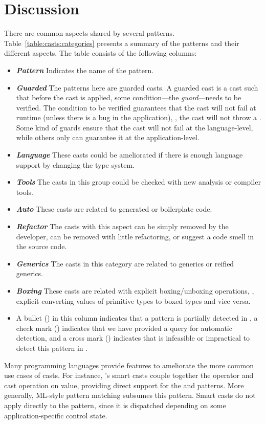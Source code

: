 \section{Discussion}\label{sec:casts:discussion}

\newcommand{\gc}[1]{\emph{\textbf{#1}}}
\newcommand{\gh}[1]{\item\gc{#1}}
There are common aspects shared by several patterns.
Table~\ref{table:casts:categories} presents a summary of the patterns and their different aspects.
The table consists of the following columns:
\begin{itemize}
\gh{Pattern} Indicates the name of the pattern.
\gh{Guarded} The patterns here are guarded casts.
A guarded cast is a cast such that before the cast is applied,
some condition---the \emph{guard}---needs to be verified.
The condition to be verified guarantees that the cast will not fail at runtime (unless there is a bug in the application), \ie,
the cast will not throw a .
Some kind of guards ensure that the cast will not fail at the language-level,
while others only can guarantee it at the application-level.
\gh{Language} These casts could be ameliorated if there is enough language support by changing the type system.
\gh{Tools} The casts in this group could be checked with new analysis or compiler tools.
\gh{Auto} These casts are related to generated or boilerplate code.
\gh{Refactor} The casts with this aspect can be simply removed by the developer,
can be removed with little refactoring,
or suggest a code smell in the source code.
\gh{Generics} The casts in this category are related to generics or reified generics.
\gh{Boxing} These casts are related with explicit boxing/unboxing operations, \ie{},
explicit converting values of primitive types to boxed types and vice versa.
\gh{\ql{}}
A bullet (\exis{}) in this column indicates that a pattern is partially detected in \ql{},
a check mark (\tick{}) indicates that we have provided a \ql{} query for automatic detection, and
a cross mark (\xmark{}) indicates that is infeasible or impractical to detect this pattern in \ql{}.
\end{itemize}



Many programming languages provide features to ameliorate the more common use cases of casts.
For instance,
\kotlin{}'s smart casts couple together the  operator and cast operation on value, 
providing direct support for the  and  patterns.
More generally, ML-style pattern matching subsumes this pattern.
Smart casts do not apply directly to the  pattern,
since it is dispatched depending on some application-specific control state.

